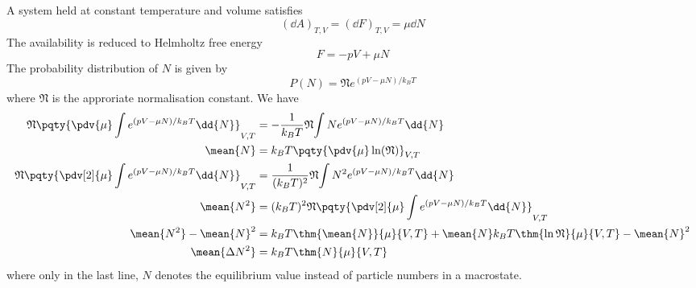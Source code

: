 \documentclass[12pt]{article}
\begin{document}
     \subsection{} A system held at constant temperature and volume satisfies \[
        (\dd{A})_{T,V} = (\dd{F})_{T,V} = \mu \dd{N}
    \]
    The availability is reduced to Helmholtz free energy \[
        F = - pV + \mu N
    \]
    The probability distribution of \(N\) is given by \[
        P(N) = \mathfrak{N} e^{ (pV - \mu N) / k_BT}
    \]where \(\mathfrak{N}\) is the approriate normalisation constant. We have \begin{align*}
        \mathfrak{N}\pqty{\pdv{\mu} \int e^{ (pV - \mu N) / k_BT} \dd{N}}_{V,T} &= - \frac{1}{k_BT}\mathfrak{N}{\int Ne^{ (pV - \mu N) / k_BT} \dd{N}} \\
        \mean{N} &= k_BT \pqty{\pdv{\mu} \ln(\mathfrak{N})}_{V,T}\\
        \mathfrak{N}\pqty{\pdv[2]{\mu} \int e^{ (pV - \mu N) / k_BT} \dd{N}}_{V,T} &= \frac{1}{(k_BT)^2}\mathfrak{N}{\int N^2e^{ (pV - \mu N) / k_BT} \dd{N}}\\
        \mean{N^2} &= (k_BT)^2 \mathfrak{N}\pqty{\pdv[2]{\mu} \int e^{ (pV - \mu N) / k_BT} \dd{N}}_{V,T}\\
        \mean{N^2} -\mean{N}^2 &= k_B T\thm{\mean{N}}{\mu}{V,T} +\mean{N} k_B T\thm{\ln \mathfrak{N}}{\mu}{V,T} -\mean{N}^2\\
        \mean{\Delta N^2} &=  k_BT \thm{N}{\mu}{V,T}
    \end{align*}
    where only in the last line, \(N\) denotes the equilibrium value instead of particle numbers in a macrostate.
\end{document}
